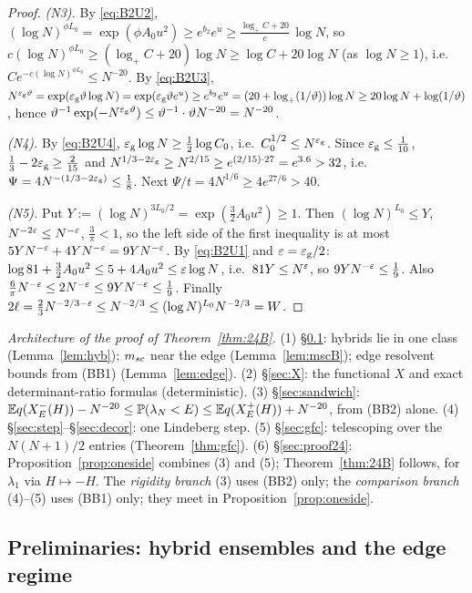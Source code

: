 \begin{proof}
\emph{\textup{(N3)}.} By \eqref{eq:B2U2}, $(\log N)^{\phi L_0}=\exp(\phi A_0u^2)\ge e^{b_2}e^u\ge\frac{\log_+C+20}c\,\log N$, so
$c(\log N)^{\phi L_0}\ge(\log_+C+20)\log N\ge\log C+20\log N$ (as $\log N\ge1$), i.e.\ $Ce^{-c(\log N)^{\phi L_0}}\le N^{-20}$.
By \eqref{eq:B2U3}, $N^{\varepsilon_{\mathrm g}\vartheta}=\exp(\varepsilon_{\mathrm g}\vartheta\log N)=\exp(\varepsilon_{\mathrm g}\vartheta e^u)\ge e^{b_3}e^u=(20+\log_+(1/\vartheta))\log N\ge20\log N+\log(1/\vartheta)$,
hence $\vartheta^{-1}\exp(-N^{\varepsilon_{\mathrm g}\vartheta})\le\vartheta^{-1}\cdot\vartheta N^{-20}=N^{-20}$.

\emph{\textup{(N4)}.} By \eqref{eq:B2U4}, $\varepsilon_{\mathrm g}\log N\ge\frac12\log C_0$, i.e.\ $C_0^{1/2}\le N^{\varepsilon_{\mathrm g}}$. Since $\varepsilon_{\mathrm g}\le\frac1{10}$, $\frac13-2\varepsilon_{\mathrm g}\ge\frac2{15}$ and
$N^{1/3-2\varepsilon_{\mathrm g}}\ge N^{2/15}\ge e^{(2/15)\cdot27}=e^{3.6}>32$, i.e.\ $\Psi=4N^{-(1/3-2\varepsilon_{\mathrm g})}\le\frac18$. Next $\Psi/t=4N^{1/6}\ge4e^{27/6}>40$.

\emph{\textup{(N5)}.} Put $Y:=(\log N)^{3L_0/2}=\exp(\frac32A_0u^2)\ge1$. Then $(\log N)^{L_0}\le Y$, $N^{-2\varepsilon}\le N^{-\varepsilon}$, $\frac3\pi<1$, so the left side of the first
inequality is at most $5YN^{-\varepsilon}+4YN^{-\varepsilon}=9YN^{-\varepsilon}$. By \eqref{eq:B2U1} and $\varepsilon=\varepsilon_{\mathrm g}/2$: $\log81+\frac32A_0u^2\le5+4A_0u^2\le\varepsilon\log N$, i.e.\ $81Y\le N^{\varepsilon}$, so
$9YN^{-\varepsilon}\le\frac19$. Also $\frac6\pi N^{-\varepsilon}\le2N^{-\varepsilon}\le9YN^{-\varepsilon}\le\frac19$. Finally $2\ell=\frac23N^{-2/3-\varepsilon}\le N^{-2/3}\le(\log N)^{L_0}N^{-2/3}=W$.
\end{proof}

\noindent\emph{Architecture of the proof of Theorem~\ref{thm:24B}.}
(1) \S\ref{sec:prelim}: hybrids lie in one class (Lemma~\ref{lem:hyb}); $m_{sc}$ near the edge (Lemma~\ref{lem:mscB}); edge resolvent bounds from (BB1) (Lemma~\ref{lem:edge}).
(2) \S\ref{sec:X}: the functional $X$ and exact determinant-ratio formulas (deterministic).
(3) \S\ref{sec:sandwich}: $\mathbb{E} q(X^-_E(H))-N^{-20}\le\mathbb{P}(\lambda_N<E)\le\mathbb{E} q(X^+_E(H))+N^{-20}$, from (BB2) alone.
(4) \S\ref{sec:step}--\S\ref{sec:decor}: one Lindeberg step. (5) \S\ref{sec:gfc}: telescoping over the $N(N+1)/2$ entries (Theorem~\ref{thm:gfc}).
(6) \S\ref{sec:proof24}: Proposition~\ref{prop:oneside} combines (3) and (5); Theorem~\ref{thm:24B} follows, for $\lambda_1$ via $H\mapsto-H$.
The \emph{rigidity branch} (3) uses (BB2) only; the \emph{comparison branch} (4)--(5) uses (BB1) only; they meet in Proposition~\ref{prop:oneside}.

\subsection{Preliminaries: hybrid ensembles and the edge regime}\label{sec:prelim}

